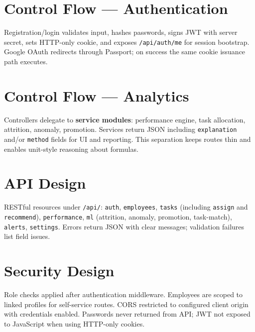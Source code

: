 \section{Control Flow --- Authentication}
Registration/login validates input, hashes passwords, signs JWT with server secret, sets HTTP-only cookie, and exposes \texttt{/api/auth/me} for session bootstrap. Google OAuth redirects through Passport; on success the same cookie issuance path executes.

\section{Control Flow --- Analytics}
Controllers delegate to \textbf{service modules}: performance engine, task allocation, attrition, anomaly, promotion. Services return JSON including \texttt{explanation} and/or \texttt{method} fields for UI and reporting. This separation keeps routes thin and enables unit-style reasoning about formulas.

\section{API Design}
RESTful resources under \texttt{/api/}: \texttt{auth}, \texttt{employees}, \texttt{tasks} (including \texttt{assign} and \texttt{recommend}), \texttt{performance}, \texttt{ml} (attrition, anomaly, promotion, task-match), \texttt{alerts}, \texttt{settings}. Errors return JSON with clear messages; validation failures list field issues.

\section{Security Design}
Role checks applied after authentication middleware. Employees are scoped to linked profiles for self-service routes. CORS restricted to configured client origin with credentials enabled. Passwords never returned from API; JWT not exposed to JavaScript when using HTTP-only cookies.
